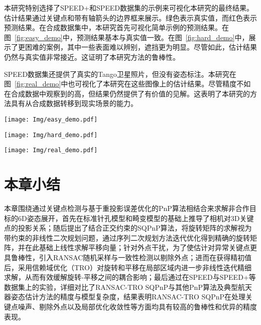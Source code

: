 本研究特别选择了SPEED+和SPEED数据集的示例来可视化本研究的最终结果。估计结果通过关键点和带有轴箭头的边界框来展示。绿色表示真实值，而红色表示预测结果。在合成数据集中，本研究首先可视化简单示例的预测结果。在图~\ref{fig:easy_demo}中，预测结果基本与真实值一致。在图~\ref{fig:hard_demo}中，展示了更困难的案例，其中一些表面难以辨别，遮挡更为明显。尽管如此，估计结果仍然与真实值非常接近。这证明了本研究方法的鲁棒性。

SPEED数据集还提供了真实的Tango卫星照片，但没有姿态标注。本研究在图~\ref{fig:real_demo}中也可视化了本研究在这些图像上的估计结果。尽管精度不如在合成数据中观察到的高，但结果仍然提供了有价值的见解。这表明了本研究的方法具有从合成数据转移到现实场景的能力。

\begin{figure*}[!t] \centering \texttt{[image: Img/easy\_demo.pdf]} \caption{SPEED+合成图像估计结果可视化的简单示例} \label{fig:easy_demo} \end{figure*}

\begin{figure*}[!t] \centering \texttt{[image: Img/hard\_demo.pdf]} \caption{SPEED+合成图像估计结果可视化的困难示例} \label{fig:hard_demo} \end{figure*}

\begin{figure*}[htbp] \centering \texttt{[image: Img/real\_demo.pdf]} \caption{在SPEED真实图像上的6D估计结果的实际示例} \label{fig:real_demo} \end{figure*}


\section{本章小结}
\label{sec:RANSAC-TRO-SQPnP:summary}
本章围绕通过关键点检测与基于重投影误差优化的PnP算法相结合来求解非合作目标的6D姿态展开，首先在标准针孔模型和畸变模型的基础上推导了相机对3D关键点的投影关系；随后提出了结合正交约束的SQPnP算法，将旋转矩阵的求解视为带约束的非线性二次规划问题，通过序列二次规划方法迭代优化得到精确的旋转矩阵，并在此基础上线性求解平移向量；针对外点干扰，为了使估计对异常关键点更具鲁棒性，引入RANSAC随机采样与一致性检测以剔除外点；进而在获得精初值后，采用信赖域优化（TRO）对旋转和平移在局部区域内进一步非线性迭代精细求解，从而有效缓解旋转-平移之间的耦合影响；最后通过在SPEED与SPEED+等数据集上的实验，详细对比了RANSAC-TRO SQPnP与其他PnP算法及典型航天器姿态估计方法的精度与模型复杂度，结果表明RANSAC-TRO SQPnP在处理关键点噪声、剔除外点以及局部优化收敛性等方面均具有较高的鲁棒性和优异的精度表现。